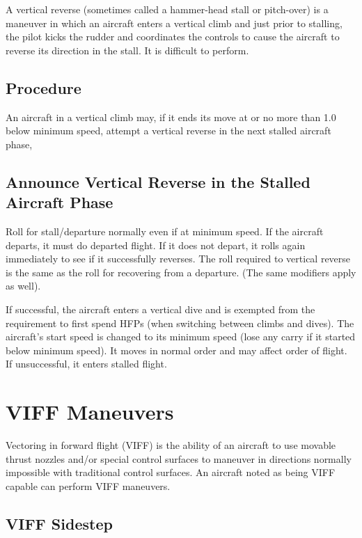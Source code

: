 \begin{advancedrules}
    A vertical reverse (sometimes called a hammer-head stall or pitch-over) is a maneuver in which an aircraft enters a vertical climb and just prior to stalling, the pilot kicks the rudder and coordinates the controls to cause the aircraft to reverse its direction in the stall. It is difficult to perform.

    \subsection{Procedure} An aircraft in a vertical climb may, if it ends its move at or no more than 1.0 below minimum speed, attempt a vertical reverse in the next stalled aircraft phase,

    \subsection{Announce Vertical Reverse in the Stalled Aircraft Phase} Roll for stall/departure normally even if at minimum speed. If the aircraft departs, it must do departed flight. If it does not depart, it rolls again immediately to see if it successfully reverses. The roll required to vertical reverse is the same as the roll for recovering from a departure. (The same modifiers apply as well).

    If successful, the aircraft enters a vertical dive and is exempted from the requirement to first spend HFPs (when switching between climbs and dives). The aircraft's start speed is changed to its minimum speed (lose any  carry if it started below minimum speed). It moves in normal order and may affect order of flight. If unsuccessful, it enters stalled flight.

    \section{VIFF Maneuvers}
    \label{rule:viff-maneuvers}

    Vectoring in forward flight (VIFF) is the ability of an aircraft to use movable thrust nozzles and/or special control surfaces to maneuver in directions normally impossible with traditional control surfaces. An aircraft noted as being VIFF capable can perform VIFF maneuvers. 

    \subsection{VIFF Sidestep}


\end{advancedrules}
